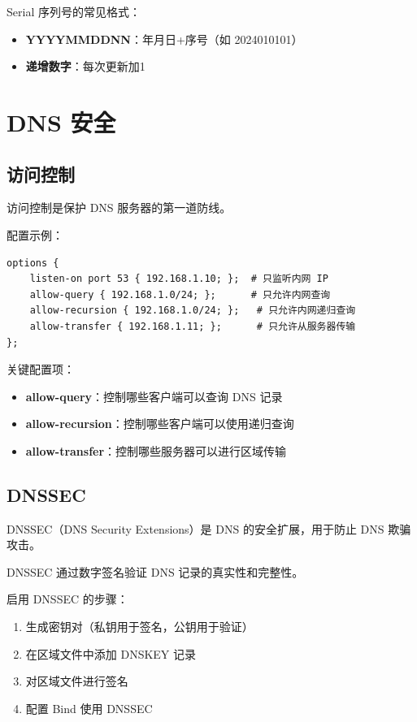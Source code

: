 \documentclass[12pt,UTF8]{ctexbook}
\begin{document}
Serial 序列号的常见格式：
\begin{itemize}
    \item \textbf{YYYYMMDDNN}：年月日+序号（如 2024010101）
    \item \textbf{递增数字}：每次更新加1
\end{itemize}

\chapter{DNS 安全}
\label{chap:dns_security}

\section{访问控制}
\label{sec:access_control}

访问控制是保护 DNS 服务器的第一道防线。

配置示例：
\begin{verbatim}
options {
    listen-on port 53 { 192.168.1.10; };  # 只监听内网 IP
    allow-query { 192.168.1.0/24; };      # 只允许内网查询
    allow-recursion { 192.168.1.0/24; };   # 只允许内网递归查询
    allow-transfer { 192.168.1.11; };      # 只允许从服务器传输
};
\end{verbatim}

关键配置项：
\begin{itemize}
    \item \textbf{allow-query}：控制哪些客户端可以查询 DNS 记录
    \item \textbf{allow-recursion}：控制哪些客户端可以使用递归查询
    \item \textbf{allow-transfer}：控制哪些服务器可以进行区域传输
\end{itemize}

\section{DNSSEC}
\label{sec:dnssec}

DNSSEC（DNS Security Extensions）是 DNS 的安全扩展，用于防止 DNS 欺骗攻击。

DNSSEC 通过数字签名验证 DNS 记录的真实性和完整性。

启用 DNSSEC 的步骤：
\begin{enumerate}
    \item 生成密钥对（私钥用于签名，公钥用于验证）
    \item 在区域文件中添加 DNSKEY 记录
    \item 对区域文件进行签名
    \item 配置 Bind 使用 DNSSEC
\end{enumerate}
\end{document}
